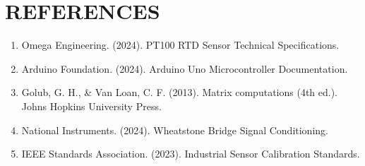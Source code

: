 \documentclass[journal]{IEEEtran}
\begin{document}
\section{\textbf{REFERENCES}}

\begin{enumerate}
\item Omega Engineering. (2024). PT100 RTD Sensor Technical Specifications.
\item Arduino Foundation. (2024). Arduino Uno Microcontroller Documentation.
\item Golub, G. H., \& Van Loan, C. F. (2013). Matrix computations (4th ed.). Johns Hopkins University Press.
\item National Instruments. (2024). Wheatstone Bridge Signal Conditioning.
\item IEEE Standards Association. (2023). Industrial Sensor Calibration Standards.
\end{enumerate}
\end{document}
